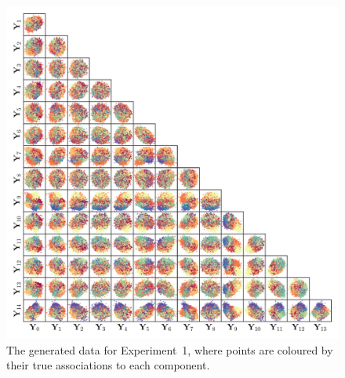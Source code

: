 \documentclass[twocolumn]{aastex62}
\begin{document}
\begin{figure}
	\includegraphics[width=1.0\textwidth]{experiments/exp1-data-colour.pdf}
    \caption{The generated data for Experiment~1, where points are coloured by their
		     true associations to each component.}
    \label{fig:exp1-data}
\end{figure}
\end{document}
